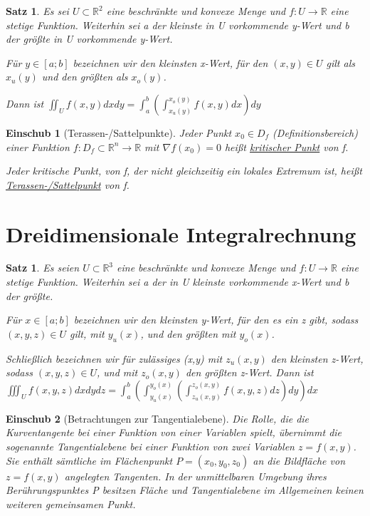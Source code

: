 \documentclass[fontset=ubuntu,11pt,a4paper,fleqn,headsepline]{scrreprt}
\newtheorem{satz}[defi]{Satz}
\newtheorem*{einschub}{Einschub}
\begin{document}
\begin{multicols}{2}
        \begin{satz}
            Es sei \(U\subset\mathbb{R}^2\) eine beschränkte und konvexe Menge und \(f:U\to\mathbb{R}\) eine stetige Funktion. Weiterhin sei a der kleinste in U vorkommende y-Wert und b der größte in U vorkommende y-Wert.
    
            Für \(y\in[a;b]\) bezeichnen wir den kleinsten x-Wert, für den \((x,y)\in U\) gilt als \(x_u(y)\) und den größten als \(x_o(y)\).
    
            Dann ist \(\iint_U f(x,y)dxdy=\int_a^b \left(\int_{x_u(y)}^{x_o(y)} f(x,y)dx\right)dy\)
        \end{satz}
    
        \begin{einschub}[Terassen-/Sattelpunkte]
            Jeder Punkt \(x_0\in D_f\) (Definitionsbereich) einer Funktion \(f:D_f\subset\mathbb{R}^n\to\mathbb{R}\) mit \(\nabla f(x_0)=0\) heißt \underline{kritischer Punkt} von f.
    
            Jeder kritische Punkt, von f, der nicht gleichzeitig ein lokales Extremum ist, heißt \underline{Terassen-/Sattelpunkt} von f.
        \end{einschub}
    
        \section*{Dreidimensionale Integralrechnung}
    
        \begin{satz}
            Es seien \(U\subset\mathbb{R}^3\) eine beschränkte und konvexe Menge und \(f:U\to\mathbb{R}\) eine stetige Funktion. Weiterhin sei a der in U kleinste vorkommende x-Wert und b der größte.
    
            Für \(x\in[a;b]\) bezeichnen wir den kleinsten y-Wert, für den es ein z gibt, sodass \((x,y,z)\in U\) gilt, mit \(y_u(x)\), und den größten mit \(y_o(x)\).
    
            Schließlich bezeichnen wir für zulässiges (x,y) mit \(z_u(x,y)\) den kleinsten z-Wert, sodass \((x,y,z)\in U\), und mit \(z_o(x,y)\) den größten z-Wert. Dann ist \(\iiint_U f(x,y,z)dxdydz=\int_a^b \left(\int_{y_u(x)}^{y_o(x)} \left(\int_{z_u(x,y)}^{z_o(x,y)} f(x,y,z)dz\right)dy\right)dx\)
        \end{satz}

        \begin{einschub}[Betrachtungen zur Tangentialebene]
            Die Rolle, die die Kurventangente bei einer Funktion von einer Variablen spielt, übernimmt die sogenannte Tangentialebene bei einer Funktion von zwei Variablen \(z=f(x,y)\). Sie enthält sämtliche im Flächenpunkt \(P=(x_0,y_0,z_0)\) an die Bildfläche von \(z=f(x,y)\) angelegten Tangenten. In der unmittelbaren Umgebung ihres Berührungspunktes P besitzen Fläche und Tangentialebene im Allgemeinen keinen weiteren gemeinsamen Punkt.
    

\end{einschub}
\end{multicols}
\end{document}
